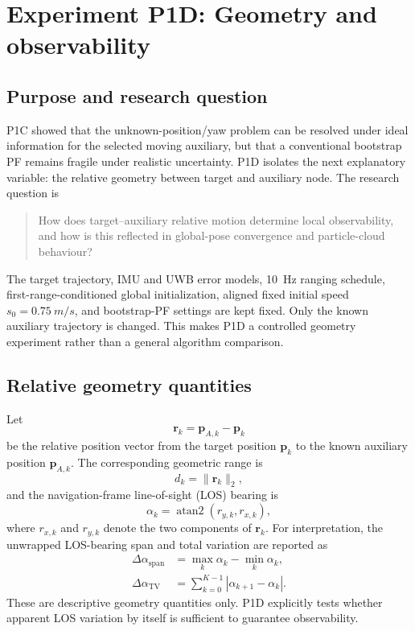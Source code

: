 \section{Experiment P1D: Geometry and observability}
\subsection{Purpose and research question}
P1C showed that the unknown-position/yaw problem can be resolved under ideal information for the selected moving auxiliary, but that a conventional bootstrap PF remains fragile under realistic uncertainty. P1D isolates the next explanatory variable: the relative geometry between target and auxiliary node. The research question is
\begin{quote}
How does target--auxiliary relative motion determine local observability, and how is this reflected in global-pose convergence and particle-cloud behaviour?
\end{quote}

The target trajectory, IMU and UWB error models, \SI{10}{Hz} ranging schedule, first-range-conditioned global initialization, aligned fixed initial speed $s_0=\SI{0.75}{m/s}$, and bootstrap-PF settings are kept fixed. Only the known auxiliary trajectory is changed. This makes P1D a controlled geometry experiment rather than a general algorithm comparison.

\subsection{Relative geometry quantities}
Let
\begin{equation}
    \bm r_k = \bm p_{A,k}-\bm p_k
\end{equation}
be the relative position vector from the target position $\bm p_k$ to the known auxiliary position $\bm p_{A,k}$. The corresponding geometric range is
\begin{equation}
    d_k=\lVert\bm r_k\rVert_2,
\end{equation}
and the navigation-frame line-of-sight (LOS) bearing is
\begin{equation}
    \alpha_k=\operatorname{atan2}(r_{y,k},r_{x,k}),
\end{equation}
where $r_{x,k}$ and $r_{y,k}$ denote the two components of $\bm r_k$. For interpretation, the unwrapped LOS-bearing span and total variation are reported as
\begin{align}
    \Delta\alpha_{\mathrm{span}}
    &= \max_k \alpha_k-\min_k\alpha_k,\\
    \Delta\alpha_{\mathrm{TV}}
    &= \sum_{k=0}^{K-1}|\alpha_{k+1}-\alpha_k|.
\end{align}
These are descriptive geometry quantities only. P1D explicitly tests whether apparent LOS variation by itself is sufficient to guarantee observability.

